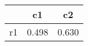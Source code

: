 \begin{table}[htbp]
\begin{tabular}{lcc} \hline \hline
 & c1  & c2  \\  \hline 
r1 &     0.498 &     0.630 \\  
\hline \hline \end{tabular}
\end{table}
